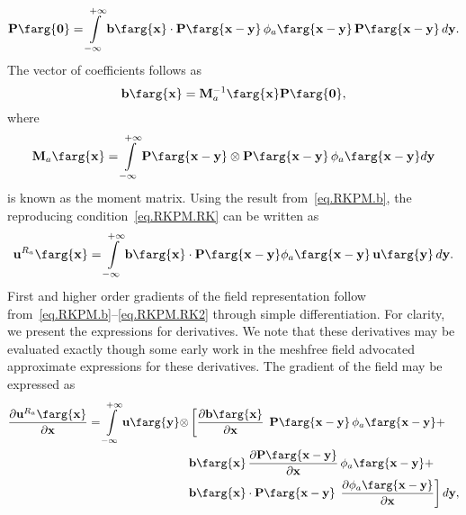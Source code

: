 \begin{equation}
\mathbf{P}\farg{\mathbf{0}}= 
    \int \limits_{-\infty}^{+\infty}
    \mathbf{b}\farg{\mathbf{x}}\cdot
    \mathbf{P}\farg{\mathbf{x}-\mathbf{y}}\,
    \phi_{a}\farg{\mathbf{x}-\mathbf{y}}\,
    \mathbf{P}\farg{\mathbf{x}-\mathbf{y}}\,d\mathbf{y}.
\end{equation}
The vector of coefficients follows as
\begin{equation}
\label{eq.RKPM.b}
\mathbf{b}\farg{\mathbf{x}}=\mathbf{M}_{a}^{-1}\farg{\mathbf{x}}
    \mathbf{P}\farg{\mathbf{0}},
\end{equation} 
where
\begin{equation}
\label{eq.RKPM.moment}
\mathbf{M}_{a}\farg{\mathbf{x}} =
    \int \limits_{-\infty}^{+\infty}
    \mathbf{P}\farg{\mathbf{x}-\mathbf{y}}
    \otimes
    \mathbf{P}\farg{\mathbf{x}-\mathbf{y}}\,
    \phi_{a}\farg{\mathbf{x}-\mathbf{y}} d\mathbf{y}
\end{equation} 
is known as the moment matrix. Using the result from~\eqref{eq.RKPM.b},
the reproducing condition~\eqref{eq.RKPM.RK} can be written as
\begin{equation}
\label{eq.RKPM.RK2}
\mathbf{u}^{R_{a}}\farg{\mathbf{x}}= \int \limits_{-\infty}^{+\infty}
    \mathbf{b}\farg{\mathbf{x}}
    \cdot \mathbf{P}\farg{\mathbf{x}-\mathbf{y}} 
    \phi_{a}\farg{\mathbf{x}-\mathbf{y}}\,
    \mathbf{u}\farg{\mathbf{y}}\,d\mathbf{y}.
\end{equation}
First and higher order gradients of the field representation follow 
from~\eqref{eq.RKPM.b}--\eqref{eq.RKPM.RK2}
through simple differentiation. For clarity, we present the expressions 
for derivatives. We note that these derivatives may be evaluated
exactly though some early work in the meshfree field advocated
approximate expressions for these derivatives\cite{Nayroles1992}. The
gradient of the field may be expressed as
\begin{equation}
\label{eq.RKPM.du}
\begin{split}
\frac{\partial \mathbf{u}^{R_{a}}\farg{\mathbf{x}}}
     {\partial \mathbf{x}}=
 \int \limits_{-\infty}^{+\infty}
    \mathbf{u}\farg{\mathbf{y}}\otimes
    & \left[ \frac{\partial \mathbf{b}\farg{\mathbf{x}}}{\partial \mathbf{x}} 
    \right.
    \,\mathbf{P}\farg{\mathbf{x}-\mathbf{y}}
    \,\phi_{a}\farg{\mathbf{x}-\mathbf{y}} + \\
    &\mathbf{b}\farg{\mathbf{x}}\,
    \frac{\partial \mathbf{P}\farg{\mathbf{x}-\mathbf{y}}}{\partial \mathbf{x}} 
    \,\phi_{a}\farg{\mathbf{x}-\mathbf{y}} + \\
    &\mathbf{b}\farg{\mathbf{x}}
    \cdot \mathbf{P}\farg{\mathbf{x}-\mathbf{y}}\,
    \left. \frac{\partial \phi_{a}\farg{\mathbf{x}-\mathbf{y}}}{\partial 
    \mathbf{x}} \right]
    d\mathbf{y},
\end{split}
\end{equation}    
